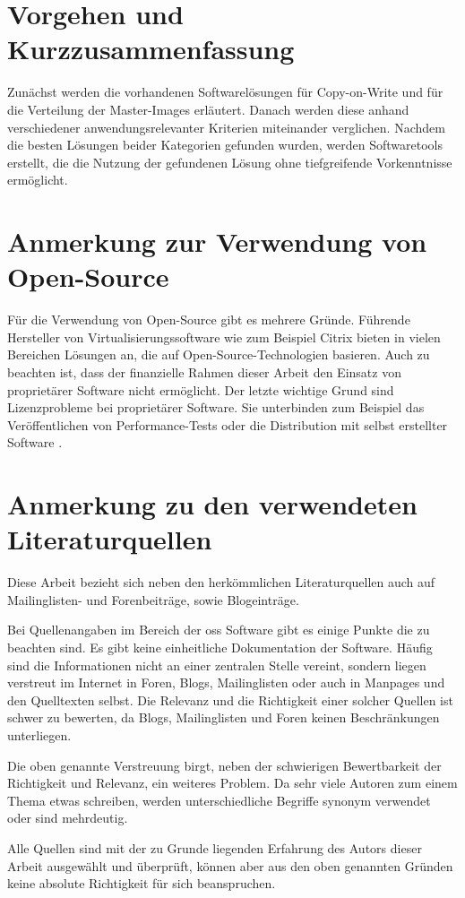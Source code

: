 \section{Vorgehen und Kurzzusammenfassung} 
Zunächst werden die vorhandenen Softwarelösungen für Copy-on-Write und für die Verteilung der Master-Images erläutert. Danach werden diese anhand verschiedener anwendungsrelevanter Kriterien miteinander verglichen. Nachdem die besten Lösungen beider Kategorien gefunden wurden, werden Softwaretools erstellt, die die Nutzung der gefundenen Lösung ohne tiefgreifende Vorkenntnisse ermöglicht.

\section{Anmerkung zur Verwendung von Open-Source}\label{opensource}
Für die Verwendung von Open-Source gibt es mehrere Gründe. Führende Hersteller von Virtualisierungssoftware wie zum Beispiel Citrix bieten in vielen Bereichen Lösungen an, die auf Open-Source-Technologien basieren. Auch zu beachten ist, dass der finanzielle Rahmen dieser Arbeit den Einsatz von proprietärer Software nicht ermöglicht. Der letzte wichtige Grund sind Lizenzprobleme bei proprietärer Software. Sie unterbinden zum Beispiel das Veröffentlichen von Performance-Tests oder die Distribution mit selbst erstellter Software \cite{Vmware}. 

\section{Anmerkung zu den verwendeten Literaturquellen}
Diese Arbeit bezieht sich neben den herkömmlichen Literaturquellen auch auf Mailinglisten- und Forenbeiträge, sowie Blogeinträge.

Bei Quellenangaben im Bereich der \gls{oss} Software gibt es einige Punkte die zu beachten sind. Es gibt keine einheitliche Dokumentation der Software. Häufig sind die Informationen nicht an einer zentralen Stelle vereint, sondern liegen verstreut im Internet in Foren, Blogs, Mailinglisten oder auch in Manpages und den Quelltexten selbst. Die Relevanz und die Richtigkeit einer solcher Quellen ist schwer zu bewerten, da Blogs, Mailinglisten und Foren keinen Beschränkungen unterliegen. \begin{comment} Das heißt, jeder der Willens ist zu einem Thema etwas zu schreiben, kann dies auch tun. \end{comment} 

Die oben genannte Verstreuung birgt, neben der schwierigen Bewertbarkeit der Richtigkeit und Relevanz, ein weiteres Problem. Da sehr viele Autoren zum einem Thema etwas schreiben, werden unterschiedliche Begriffe synonym verwendet oder sind mehrdeutig.

Alle Quellen sind mit der zu Grunde liegenden Erfahrung des Autors dieser Arbeit ausgewählt und überprüft, können aber aus den oben genannten Gründen keine absolute Richtigkeit für sich beanspruchen.

